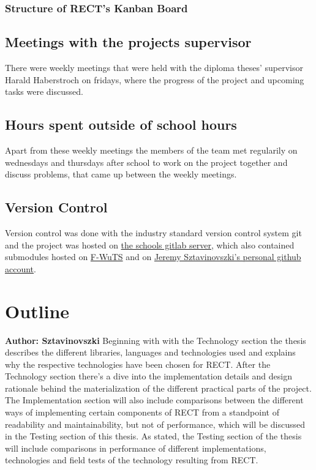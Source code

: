 \subsubsection{Structure of RECT's Kanban Board}

\subsection{Meetings with the projects supervisor}
There were weekly meetings that were held with the diploma theses' supervisor Harald Haberstroch on fridays, where the progress of the project and upcoming tasks were discussed.

\subsection{Hours spent outside of school hours} 
Apart from these weekly meetings the members of the team met regularily on wednesdays and thursdays after school to work on the project together and discuss problems, that came up between the weekly meetings.

\subsection{Version Control}
Version control was done with the industry standard version control system git and the project was hosted on \href{https://gitlab.htlwrn.ac.at/Sztavinovszki.Jeremy/RECT}{the schools gitlab server}, 
which also contained submodules hosted on \href{https://github.com/F-WuTS/}{F-WuTS} and on \href{https://github.com/if-loop69420}{Jeremy Sztavinovszki's personal github account}.

\section{Outline}
\textbf{Author: Sztavinovszki}
Beginning with with the Technology section the thesis describes the different libraries, languages and technologies used and explains why the respective technologies have been chosen for RECT.
After the Technology section there's a dive into the implementation details and design rationale behind the materialization of the different practical parts of the project.
The Implementation section will also include comparisons between the different ways of implementing certain components of RECT from a standpoint of readability and maintainability, but not of performance,
which will be discussed in the Testing section of this thesis. As stated, the Testing section of the thesis will include comparisons in performance of different implementations,
technologies and field tests of the technology resulting from RECT.

